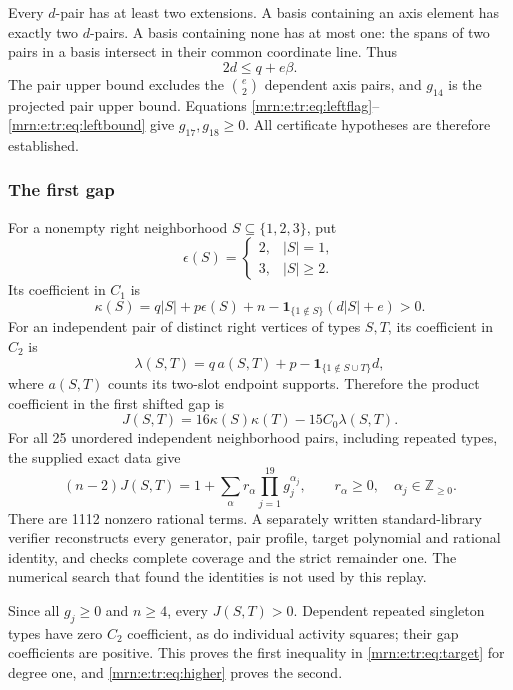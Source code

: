 \documentclass[11pt,a4paper]{article}
\theoremstyle{remark}\newtheorem{remark}[theorem]{Remark}
\begin{document}
Every $d$-pair has at least two extensions. A basis containing an axis element has exactly two $d$-pairs. A basis containing none has at most one: the spans of two pairs in a basis intersect in their common coordinate line. Thus
\[
 2d\le q+e\beta.
\]
The pair upper bound excludes the $\binom e2$ dependent axis pairs, and $g_{14}$ is the projected pair upper bound. Equations \eqref{mrn:e:tr:eq:leftflag}--\eqref{mrn:e:tr:eq:leftbound} give $g_{17},g_{18}\ge0$. All certificate hypotheses are therefore established.

\subsubsection{The first gap}
For a nonempty right neighborhood $S\subseteq\{1,2,3\}$, put
\[
 \epsilon(S)=
 \begin{cases}2,&|S|=1,\\3,&|S|\ge2.\end{cases}
\]
Its coefficient in $C_1$ is
\[
 \kappa(S)=q|S|+p\epsilon(S)+n
      -\mathbf1_{\{1\notin S\}}(d|S|+e)>0.
\]
For an independent pair of distinct right vertices of types $S,T$, its coefficient in $C_2$ is
\[
 \lambda(S,T)=q\,a(S,T)+p
              -\mathbf1_{\{1\notin S\cup T\}}d,
\]
where $a(S,T)$ counts its two-slot endpoint supports. Therefore the product coefficient in the first shifted gap is
\[
 J(S,T)=16\kappa(S)\kappa(T)-15C_0\lambda(S,T).
\]
For all 25 unordered independent neighborhood pairs, including repeated types, the supplied exact data give
\begin{equation}\label{mrn:e:tr:eq:certificate}
 (n-2)J(S,T)
   =1+\sum_\alpha r_\alpha\prod_{j=1}^{19}g_j^{\alpha_j},
 \qquad r_\alpha\ge0,\quad\alpha_j\in\mathbb Z_{\ge0}.
\end{equation}
There are 1112 nonzero rational terms. A separately written standard-library verifier reconstructs every generator, pair profile, target polynomial and rational identity, and checks complete coverage and the strict remainder one. The numerical search that found the identities is not used by this replay.

Since all $g_j\ge0$ and $n\ge4$, every $J(S,T)>0$. Dependent repeated singleton types have zero $C_2$ coefficient, as do individual activity squares; their gap coefficients are positive. This proves the first inequality in \eqref{mrn:e:tr:eq:target} for degree one, and \eqref{mrn:e:tr:eq:higher} proves the second.
\end{document}
